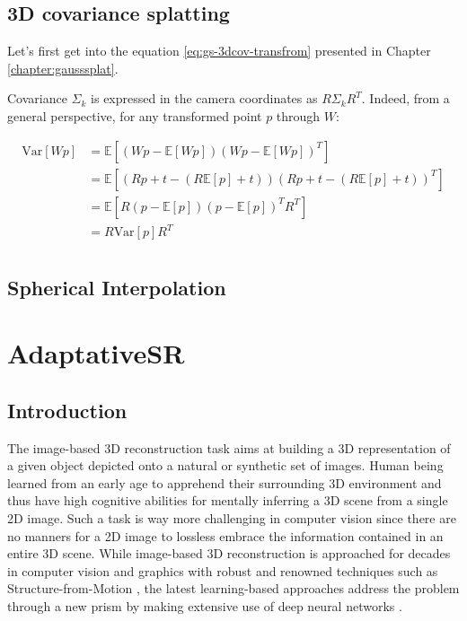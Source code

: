 \subsection{3D covariance splatting}
\label{appendix:cov}
Let's first get into the equation \ref{eq:gs-3dcov-transfrom} presented in Chapter \ref{chapter:gausssplat}. 

Covariance $\Sigma_{k}$ is expressed in the camera coordinates as $R\Sigma_{k}R^{T}$. Indeed, from a general perspective, for any transformed point $p$ through $W$: 

\begin{equation}
    \begin{aligned}
    \text{Var}[Wp] &= \mathbb{E}[(Wp - \mathbb{E}[Wp])(Wp - \mathbb{E}[Wp])^T] \\
    &= \mathbb{E}[(Rp+t - (R\mathbb{E}[p]+t))(Rp+t - (R\mathbb{E}[p]+t))^T] \\
    &= \mathbb{E}[R(p - \mathbb{E}[p])(p - \mathbb{E}[p])^T R^T] \\
    &= R\text{Var}[p]R^T \\
    \end{aligned}
    \end{equation}

\subsection{Spherical Interpolation}
\label{appendix:spherical-interp}



\section{AdaptativeSR}
\subsection{Introduction}
\label{appendix:adaptativesr-intro}

The image-based 3D reconstruction task aims at building a 3D representation of a given object depicted onto a natural or synthetic set of images. Human being learned from an early age to apprehend their surrounding 3D environment and thus have high cognitive abilities for mentally inferring a 3D scene from a single 2D image. Such a task is way more challenging in computer vision since there are no manners for a 2D image to lossless embrace the information contained in an entire 3D scene. While image-based 3D reconstruction is approached for decades in computer vision and graphics with robust and renowned techniques such as Structure-from-Motion \citep{longuet1981computer}, the latest learning-based approaches address the problem through a new prism by making extensive use of deep neural networks
\citep{kanazawa2018learning,deng2019accurate,saito2020pifuhd}.

